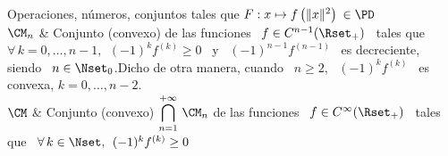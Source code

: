 \begin{notation}{Operaciones, n\'umeros,  conjuntos}
tales que $F: x \mapsto f\left( \|x\|^2 \right) \: \in \PD$\\[2.5mm]
\hline
%
$\CM_n$ & Conjunto (convexo) de las funciones \ $f \in C^{n-1}(\Rset_+)$ \ tales
que \ $\forall \, k = 0 , \ldots , n-1, \:\: (-1)^k f^{(k)} \ge 0$ \ y \
$(-1)^{n-1} f^{(n-1)}$ \ es decreciente, siendo \ $n \in \Nset_0$.\newline Dicho
de otra manera, cuando \ $n \ge 2$, \ $(-1)^k f^{(k)}$ \ es convexa, $k = 0,
\ldots , n-2$.\\[2.5mm]
\hline
%
$\CM$ & Conjunto (convexo) $\displaystyle \bigcap_{n=1}^{+\infty} \, \CM_n$ de
las funciones \ $f \in C^{\infty}(\Rset_+)$ \ tales que \ $\forall \, k \in
\Nset, \:\: (-1)^k f^{(k)} \ge 0$
\end{notation}
